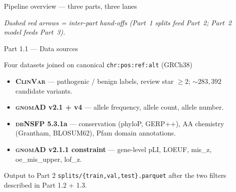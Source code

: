 \documentclass[aspectratio=169,10pt]{beamer}
\begin{document}
\begin{frame}{Pipeline overview --- three parts, three lanes}

  \vspace{0.3em}
  \footnotesize
  \emph{Dashed red arrows = inter-part hand-offs (Part~1 splits feed Part~2;
  Part~2 model feeds Part~3).}
\end{frame}

\begin{frame}{Part 1.1 --- Data sources}
  \footnotesize
  \begin{block}{Four datasets joined on canonical \texttt{chr:pos:ref:alt} (GRCh38)}
    \begin{itemize}\setlength{\itemsep}{0.25em}
      \item \textbf{\textsc{ClinVar}} --- pathogenic / benign labels,
            review star $\geq 2$; ${\sim}283{,}392$ candidate variants.
      \item \textbf{\textsc{gnomAD} v2.1 + v4} --- allele frequency,
            allele count, allele number.
      \item \textbf{\textsc{dbNSFP} 5.3.1a} --- conservation
            (phyloP, GERP++), AA chemistry (Grantham, BLOSUM62),
            Pfam domain annotations.
      \item \textbf{\textsc{gnomAD} v2.1.1 constraint} --- gene-level
            pLI, LOEUF, mis\_z, oe\_mis\_upper, lof\_z.
    \end{itemize}
  \end{block}

  \vspace{0.5em}
  \begin{exampleblock}{Output to Part 2}
    \texttt{splits/\{train,val,test\}.parquet} after the two filters
    described in Part 1.2 + 1.3.
  \end{exampleblock}
\end{frame}
\end{document}
